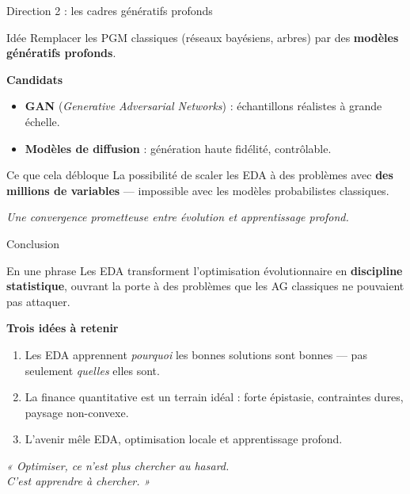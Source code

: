 \documentclass[10pt,aspectratio=169]{beamer}
\begin{document}
\begin{frame}{Direction 2 : les cadres génératifs profonds}
\begin{block}{Idée}
Remplacer les PGM classiques (réseaux bayésiens, arbres) par des \textbf{modèles génératifs profonds}.
\end{block}

\vspace{0.3cm}
\textbf{Candidats}
\begin{itemize}
  \item \textbf{GAN} (\emph{Generative Adversarial Networks}) : échantillons réalistes à grande échelle.
  \item \textbf{Modèles de diffusion} : génération haute fidélité, contrôlable.
\end{itemize}

\vspace{0.3cm}
\begin{exampleblock}{Ce que cela débloque}
La possibilité de scaler les EDA à des problèmes avec \textbf{des millions de variables} — impossible avec les modèles probabilistes classiques.
\end{exampleblock}

\vspace{0.2cm}
\centering
\textit{Une convergence prometteuse entre évolution et apprentissage profond.}
\end{frame}

\begin{frame}{Conclusion}
\begin{block}{En une phrase}
Les EDA transforment l'optimisation évolutionnaire en \textbf{discipline statistique}, ouvrant la porte à des problèmes que les AG classiques ne pouvaient pas attaquer.
\end{block}

\vspace{0.3cm}
\textbf{Trois idées à retenir}
\begin{enumerate}
  \item Les EDA apprennent \emph{pourquoi} les bonnes solutions sont bonnes — pas seulement \emph{quelles} elles sont.
  \item La finance quantitative est un terrain idéal : forte épistasie, contraintes dures, paysage non-convexe.
  \item L'avenir mêle EDA, optimisation locale et apprentissage profond.
\end{enumerate}

\vspace{0.3cm}
\begin{center}
\large\itshape
« Optimiser, ce n'est plus chercher au hasard.\\
C'est apprendre à chercher. »
\end{center}
\end{frame}
\end{document}
